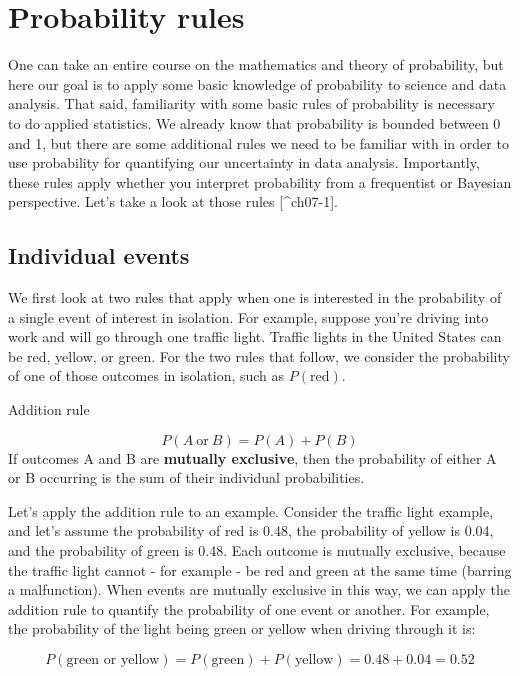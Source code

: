 \documentclass[
]{book}
\begin{document}
\section{Probability rules}\label{probability-rules}

One can take an entire course on the mathematics and theory of probability, but here our goal is to apply some basic knowledge of probability to science and data analysis. That said, familiarity with some basic rules of probability is necessary to do applied statistics. We already know that probability is bounded between 0 and 1, but there are some additional rules we need to be familiar with in order to use probability for quantifying our uncertainty in data analysis. Importantly, these rules apply whether you interpret probability from a frequentist or Bayesian perspective. Let's take a look at those rules {[}\^{}ch07-1{]}.

\subsection{Individual events}\label{individual-events}

We first look at two rules that apply when one is interested in the probability of a single event of interest in isolation. For example, suppose you're driving into work and will go through one traffic light. Traffic lights in the United States can be red, yellow, or green. For the two rules that follow, we consider the probability of one of those outcomes in isolation, such as \(P(\text{red})\).

Addition rule

\[
P(A\ \text{or}\ B) = P(A) + P(B)
\] If outcomes A and B are \textbf{mutually exclusive}, then the probability of either A or B occurring is the sum of their individual probabilities.

Let's apply the addition rule to an example. Consider the traffic light example, and let's assume the probability of red is 0.48, the probability of yellow is 0.04, and the probability of green is 0.48. Each outcome is mutually exclusive, because the traffic light cannot - for example - be red and green at the same time (barring a malfunction). When events are mutually exclusive in this way, we can apply the addition rule to quantify the probability of one event or another. For example, the probability of the light being green or yellow when driving through it is:

\[
P(\text{green or yellow})= P(\text{green}) + P(\text{yellow}) = 0.48 + 0.04 = 0.52
\]
\end{document}
